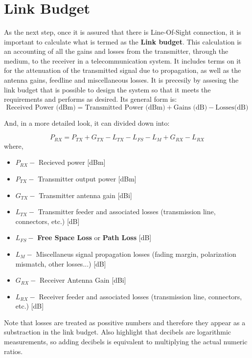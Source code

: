 \section{Link Budget}\label{subsec:link_budget}
\paragraph{}
As the next step, once it is assured that there is Line-Of-Sight connection, it is important to calculate what is termed as the \textbf{Link budget}. This calculation is an accounting of all the gains and losses from the transmitter, through the medium,  to the receiver in a telecommunication system. It includes terms on it for the attenuation of the transmitted signal due to propagation, as well as the antenna gains, feedline and miscellaneous losses. It is precesily by assesing the link budget that is possible to design the system so that it meets the requirements and performs as desired. Its general form is:
\begin{equation*}\label{eq:link_budget} 
 		\text{Received Power (dBm)} = \text{Transmitted Power (dBm)} + \text{Gains (dB)} - \text{Losses(dB)}
\end{equation*}

And, in a more detailed look, it can divided down into:

\begin{equation*}\label{eq:link_budget} 
 		P_{RX} = P_{TX} + G_{TX} - L_{TX} - L_{FS} - L_{M} + G_{RX} - L_{RX}
\end{equation*}
where,
\begin{itemize}
	\item{$P_{RX} -$ Recieved power [dBm]}
	\item{$P_{TX} -$ Transmitter output power [dBm]}
	\item{$G_{TX} -$ Transmitter antenna gain [dBi]}
	\item{$L_{TX} -$ Transmitter feeder and associated losses (transmission line, connectors, etc.) [dB]}
	\item{$L_{FS} -$ \textbf{Free Space Loss} or \textbf{Path Loss} [dB]}
	\item{$L_{M} -$ Miscellaneus signal propagation losses (fading margin, polarization mismatch, other losses...) [dB]} 
	\item{$G_{RX} -$ Receiver Antenna Gain [dBi]}
	\item{$L_{RX} -$ Receiver feeder and associated losses (transmission line, connectors, etc.) [dB]} 
\end{itemize}
Note that losses are treated as possitive numbers and therefore they appear as a substraction in the link budget. Also highlight that decibels are logarithmic measurements, so adding decibels is equivalent to multiplying the actual numeric ratios.
 
